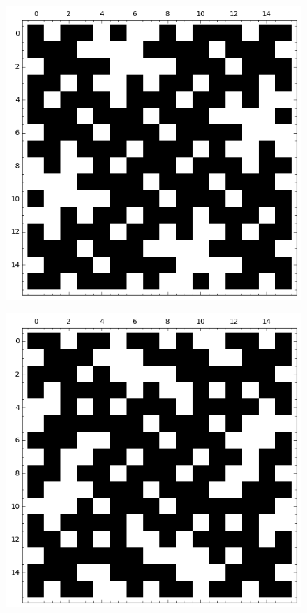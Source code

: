 \documentclass[12pt,a4paper]{article}
\begin{document}
\begin{figure}
\centering
\begin{minipage}{.48\textwidth}
  \centering
  \includegraphics[width=.9\linewidth]{../matrix_plot/sigma_2_bent_cayley_graph_index_matrix.png}
  \label{fig:sigma_2_bent_cayley_graph_index_matrix}
\end{minipage}%
\begin{minipage}{.48\textwidth}
  \centering
  \includegraphics[width=.9\linewidth]{../matrix_plot/tau_2_bent_cayley_graph_index_matrix.png}
  \label{fig:tau_2_bent_cayley_graph_index_matrix}
\end{minipage}
\end{figure}
\end{document}

